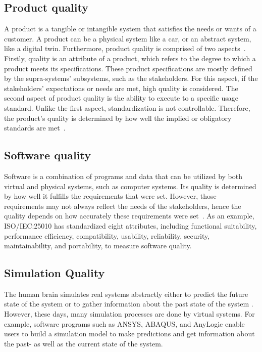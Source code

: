 \documentclass{llncs}
\begin{document}
    \subsection{Product quality}
    A product is a tangible or intangible system that satisfies the needs or wants of a customer. 
    A product can be a physical system like a car, or an abstract system, like a digital twin. Furthermore, product quality is comprised of two aspects~\cite{GrievesPLMBook}.  
    Firstly, quality is an attribute of a product, which refers to the degree to which a product meets its specifications. These product specifications are mostly defined by the supra-systems' subsystems, such as the stakeholders.
    For this aspect, if the stakeholders' expectations or needs are met,  high quality is considered. The second aspect of product quality is the ability to execute to a specific usage standard.
    Unlike the first aspect, standardization is not controllable. Therefore, the product's quality is determined by how well the implied or obligatory standards are met~\cite{GrievesPLMBook}.

    \subsection{Software quality}
    Software is a combination of programs and data that can be utilized by both virtual and physical systems, 
    such as computer systems\cite{OxfordDictionary}. Its quality is determined by how well it fulfills the requirements that were set. However, 
    those requirements may not always reflect the needs of the stakeholders, hence the quality depends on how accurately these requirements were set~\cite{IEE730-2014}. 
    As an example, ISO/IEC:25010 has standardized eight attributes, 
    including functional suitability, performance efficiency, compatibility, usability, reliability, security, maintainability, and portability, to measure software quality.
    
    \subsection{Simulation Quality}
    The human brain simulates real systems abstractly either to predict the future state of the system or to gather information about the past state of the system 
    \cite{MobusSystemTheory}. However, these days, many simulation processes are done by virtual systems. For example,  software programs such as ANSYS\cite{Ansys}, ABAQUS\cite{Abaqus}, and AnyLogic\cite{AnyLogic} enable users 
    to build a simulation model to make predictions and get information about the past- as well as the current state of the system.  
    
\end{document}
